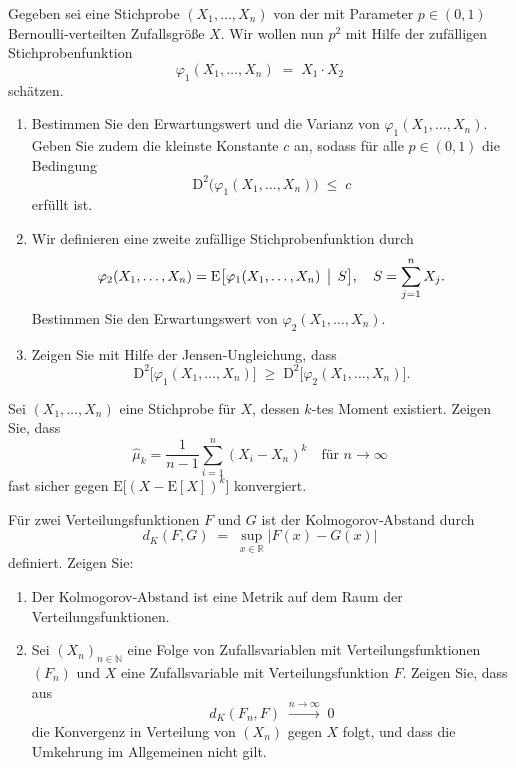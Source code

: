 \begin{aufgabe}
Gegeben sei eine Stichprobe \((X_1,\dots,X_n)\) von der mit Parameter \(p\in(0,1)\) Bernoulli‑verteilten Zufallsgröße \(X\). Wir wollen nun \(p^2\) mit Hilfe der zufälligen Stichprobenfunktion
\[
  \varphi_1(X_1,\dots,X_n) \;=\; X_1 \cdot X_2
\]
schätzen.
\begin{enumerate}
  \item Bestimmen Sie den Erwartungswert und die Varianz von \(\varphi_1(X_1,\dots,X_n)\). Geben Sie zudem die kleinste Konstante \(c\) an, sodass für alle \(p\in(0,1)\) die Bedingung
  \[
    \mathrm{D}^2\bigl(\varphi_1(X_1,\dots,X_n)\bigr) \;\le\; c
  \]
  erfüllt ist.
  \item Wir definieren eine zweite zufällige Stichprobenfunktion durch
  \[
    \varphi_2(X_1,\dots,X_n)
    = \mathrm{E}\bigl[\varphi_1(X_1,\dots,X_n)\,\bigm|\,S\bigr],
    \quad
    S = \sum_{j=1}^n X_j.
  \]
  Bestimmen Sie den Erwartungswert von \(\varphi_2(X_1,\dots,X_n)\).
  \item Zeigen Sie mit Hilfe der Jensen-Ungleichung, dass
  \[
    \mathrm{D}^2\bigl[\varphi_1(X_1,\dots,X_n)\bigr]
    \;\ge\;
    \mathrm{D}^2\bigl[\varphi_2(X_1,\dots,X_n)\bigr].
  \]
\end{enumerate}
\end{aufgabe}

\begin{aufgabe}
Sei \((X_1,\dots,X_n)\) eine Stichprobe für \(X\), dessen \(k\)-tes Moment existiert. Zeigen Sie, dass
\[
  \hat\mu_k
  = \frac{1}{n-1}
    \sum_{i=1}^n (X_i - X_n)^k
  \quad\text{für }n\to\infty
\]
fast sicher gegen \(\mathrm{E}\bigl[(X - \mathrm{E}[X])^k\bigr]\) konvergiert.
\end{aufgabe}

\begin{aufgabe}
Für zwei Verteilungsfunktionen \(F\) und \(G\) ist der Kolmogorov‑Abstand durch
\[
  d_K(F,G) \;=\; \sup_{x\in\mathbb{R}} \bigl|F(x) - G(x)\bigr|
\]
definiert. Zeigen Sie:
\begin{enumerate}
  \item Der Kolmogorov‑Abstand ist eine Metrik auf dem Raum der Verteilungsfunktionen.
  \item Sei \((X_n)_{n\in\mathbb{N}}\) eine Folge von Zufallsvariablen mit Verteilungsfunktionen \((F_n)\) und \(X\) eine Zufallsvariable mit Verteilungsfunktion \(F\). Zeigen Sie, dass aus
  \[
    d_K(F_n,F)\;\xrightarrow{n\to\infty}\;0
  \]
  die Konvergenz in Verteilung von \((X_n)\) gegen \(X\) folgt, und dass die Umkehrung im Allgemeinen nicht gilt.
\end{enumerate}
\end{aufgabe}

